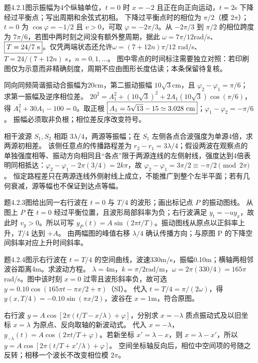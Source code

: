 \problemtext 题4.2.1图示振幅为4个纵轴单位，$t=0$ 时 $x=-2$ 且正在向正向运动，$t=2$s 下降经过平衡点；写出周期和余弦式初相。
\workings 下降过平衡点时的相位为 $\pi/2$（模 $2\pi$）；$t=0$ 为 $\cos\varphi=-1/2$ 且 $v>0$，可取 $\varphi=-2\pi/3$。从 $-2\pi/3$ 到 $\pi/2$ 的相位跨度为 $7\pi/6$，若图中两时刻之间没有额外整周期，据此 $\omega=7\pi/12$rad/s、$\boxed{T=24/7\ {\rm s}}$。仅凭两端状态还允许$\omega=(7+12n)\pi/12$ rad/s、$T=24/(7+12n)$ s，$n=0,1,\ldots$。
\crosscheck 图中零点的时间标注需要独立对照：若印刷图仅为示意而非精确刻度，周期不应由图形长度估读；本条保留待复核。

\problemtext 同向同频简谐振动合振幅为20cm，第二振动振幅 $10\sqrt3$cm，且 $\varphi_2-\varphi_1=\pi/6$；求第一振幅及逆序相位差。
\workings $20^2=A_1^2+(10\sqrt3)^2+2A_1(10\sqrt3)\cos(\pi/6)$，得 $A_1^2+30A_1-100=0$。取正根 $\boxed{A_1=5\sqrt{13}-15\simeq3.028\ {\rm cm}}$；$\boxed{\varphi_1-\varphi_2=-\pi/6}$。
\crosscheck 振幅必须取非负根；相位差反序改变符号。

\problemtext 相干波源 $S_1,S_2$ 相距 $3\lambda/4$，两源等振幅；在 $S_1$ 左侧各点合波强度为单源4倍，求两源初相差。
\workings 该侧任意点的传播路程差为 $r_2-r_1=3\lambda/4$；假设两波在观察点的单独强度相等、振动方向相同且“各点”限于两源连线的左侧射线，强度达到4倍表明同相抵达：$\varphi_2-\varphi_1-2\pi(3/4)=2k\pi$，故 $\boxed{\varphi_2-\varphi_1=3\pi/2\equiv-\pi/2\pmod{2\pi}}$。
\crosscheck 恒定路程差只在两源连线外侧射线上成立，不能推广到整个左半平面；若有几何衰减，源等幅也不保证到达点等幅。

\problemtext 题4.2.3图给出同一右行波在 $t=0$ 与 $T/4$ 的波形；画出标记点 $P$ 的振动图线。
\workings 从图上 $P$ 在 $t=0$ 经过平衡位置，且波形局部斜率为负；右行波满足 $y_t=-u y_x$，故此时 $v_y>0$。所以可写 $\boxed{y_P(t)=A\sin(2\pi t/T)}$。振动图线从原点以正斜率上升，$T/4$ 达到 $+A$。
\crosscheck 由两幅图的峰值右移 $\lambda/4$ 确认传播方向；与原图 P 的下降空间斜率对应上升时间斜率。

\problemtext 题4.2.4图示右行波在 $t=T/4$ 的空间曲线，波速330m/s，振幅0.10m；横轴两相邻波谷距离4m。求波动方程。
\workings $\lambda=4$m，$k=\pi/2$rad/m，$\omega=2\pi(330/4)=165\pi$rad/s。图中该时刻 $x=0$ 过零且波形斜率负，故可选 $\boxed{y=0.10\cos(165\pi t-\pi x/2+\pi)}$（SI）。
\crosscheck 代入 $t=T/4=\pi/(2\omega)$，得 $y(x,T/4)=-0.10\sin(\pi x/2)$，波谷在 $x=1$m，符合原图。

\problemtext 右行波 $y=A\cos[2\pi(t/T-x/\lambda)+\varphi]$，分别求 $x=-\lambda$ 质点振动式及以旧坐标 $x=\lambda$ 为原点、反向取轴的新波动式。
\workings 代入 $x=-\lambda$，$\boxed{y_{-\lambda}(t)=A\cos(2\pi t/T+\varphi)}$。若新坐标 $x'=\lambda-x$，则 $x=\lambda-x'$，所以 $\boxed{y=A\cos[2\pi(t/T+x'/\lambda)+\varphi]}$。
\crosscheck 空间坐标轴反向后，相位中空间项的号随之反转；相移一个波长不改变相位模 $2\pi$。

